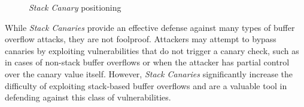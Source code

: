 \begin{figure}
  \centering
  \def\stackalignment{r} %
  {\scriptsize \parbox[t]{\linewidth}{}}
  \caption{\textit{Stack Canary} positioning}
  \label{fig:canary}
\end{figure}

While \textit{Stack Canaries} provide an effective defense against many types of
buffer overflow attacks, they are not foolproof. Attackers may attempt to bypass
canaries by exploiting vulnerabilities that do not trigger a canary check, such as
in cases of non-stack buffer overflows or when the attacker has partial control over
the canary value itself. However, \textit{Stack Canaries} significantly increase
the difficulty of exploiting stack-based buffer overflows and are a valuable
tool in defending against this class of vulnerabilities.

